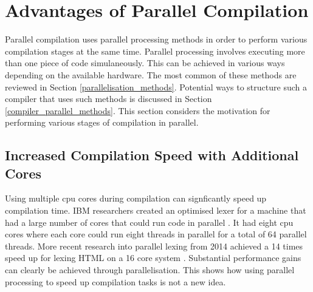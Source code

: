 \section{Advantages of Parallel Compilation} \label{advantages_parallel_compilation}

Parallel compilation uses parallel processing methods in order to perform
various compilation stages at the same time. Parallel processing involves
executing more than one piece of code simulaneously. This can be achieved in
various ways depending on the available hardware. The most common of these
methods are reviewed in Section \ref{parallelisation_methods}. Potential ways
to structure such a compiler that uses such methods is discussed in Section
\ref{compiler_parallel_methods}. This section considers the motivation for
performing various stages of compilation in parallel.

\subsection{Increased Compilation Speed with Additional Cores}

Using multiple \gls{cpu} cores during compilation can signficantly speed
up compilation time. IBM researchers created an optimised lexer for a
machine that had a large number of cores that could run code in parallel
\citep{scarpazza_high-performance_2009}. It had eight \gls{cpu} cores where each
core could run eight threads in parallel for a total of 64 parallel threads.
More recent research into parallel lexing from 2014 achieved a 14 times speed
up for lexing HTML on a 16 core system \citep{mytkowicz_data-parallel_2014}.
Substantial performance gains can clearly be achieved through parallelisation.
This shows how using parallel processing to speed up compilation tasks is not a
new idea.

